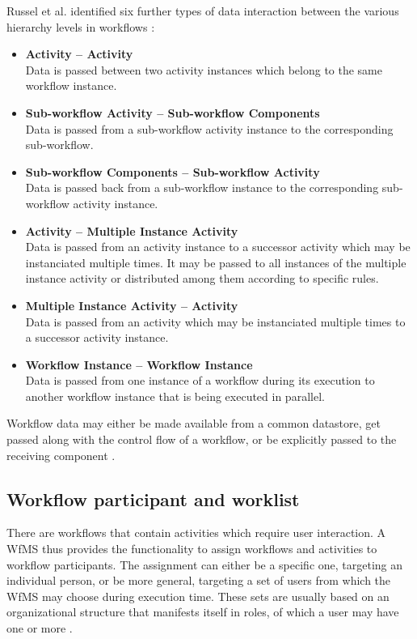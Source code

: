     Russel et al. identified six further types of data interaction between the various hierarchy levels in workflows \cite[p.~16-24]{Russell2005Workflow}:
    \begin{itemize}[nosep]
      \item \textbf{Activity -- Activity} \hfill \\
        Data is passed between two activity instances which belong to the same workflow instance.
      \item \textbf{Sub-workflow Activity -- Sub-workflow Components} \hfill \\
        Data is passed from a sub-workflow activity instance to the corresponding sub-workflow.
      \item \textbf{Sub-workflow Components -- Sub-workflow Activity} \hfill \\
        Data is passed back from a sub-workflow instance to the corresponding sub-workflow activity instance.
      \item \textbf{Activity -- Multiple Instance Activity} \hfill \\
        Data is passed from an activity instance to a successor activity which may be instanciated multiple times. It may be passed to all instances of the multiple instance activity or distributed among them according to specific rules.
      \item \textbf{Multiple Instance Activity -- Activity} \hfill \\
        Data is passed from an activity which may be instanciated multiple times to a successor activity instance.
      \item \textbf{Workflow Instance -- Workflow Instance} \hfill \\
        Data is passed from one instance of a workflow during its execution to another workflow instance that is being executed in parallel.
    \end{itemize}

    Workflow data may either be made available from a common datastore, get passed along with the control flow of a workflow, or be explicitly passed to the receiving component \cite[pp.~16-21]{Russell2005Workflow}.

  \subsection{Workflow participant and worklist} %
  \label{sub:workflow_participants}
    There are workflows that contain activities which require user interaction. A \ac{WfMS} thus provides the functionality to assign workflows and activities to workflow participants. The assignment can either be a specific one, targeting an individual person, or be more general, targeting a set of users from which the \ac{WfMS} may choose during execution time. These sets are usually based on an organizational structure that manifests itself in roles, of which a user may have one or more \cite{Hollingsworth1995Wfmc,Casati1999Specification}.

